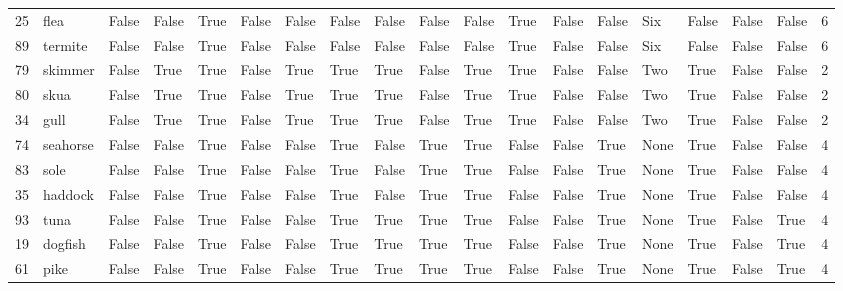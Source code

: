 \begin{tabular}{llllllllllllllllllr}
25  &        flea &  False &     False &   True &  False &     False &    False &     False &    False &     False &      True &     False &  False &    Six &  False &     False &    False &           6 \\
89  &     termite &  False &     False &   True &  False &     False &    False &     False &    False &     False &      True &     False &  False &    Six &  False &     False &    False &           6 \\
79  &     skimmer &  False &      True &   True &  False &      True &     True &      True &    False &      True &      True &     False &  False &    Two &   True &     False &    False &           2 \\
80  &        skua &  False &      True &   True &  False &      True &     True &      True &    False &      True &      True &     False &  False &    Two &   True &     False &    False &           2 \\
34  &        gull &  False &      True &   True &  False &      True &     True &      True &    False &      True &      True &     False &  False &    Two &   True &     False &    False &           2 \\
74  &    seahorse &  False &     False &   True &  False &     False &     True &     False &     True &      True &     False &     False &   True &   None &   True &     False &    False &           4 \\
83  &        sole &  False &     False &   True &  False &     False &     True &     False &     True &      True &     False &     False &   True &   None &   True &     False &    False &           4 \\
35  &     haddock &  False &     False &   True &  False &     False &     True &     False &     True &      True &     False &     False &   True &   None &   True &     False &    False &           4 \\
93  &        tuna &  False &     False &   True &  False &     False &     True &      True &     True &      True &     False &     False &   True &   None &   True &     False &     True &           4 \\
19  &     dogfish &  False &     False &   True &  False &     False &     True &      True &     True &      True &     False &     False &   True &   None &   True &     False &     True &           4 \\
61  &        pike &  False &     False &   True &  False &     False &     True &      True &     True &      True &     False &     False &   True &   None &   True &     False &     True &           4 \\

\end{tabular}
